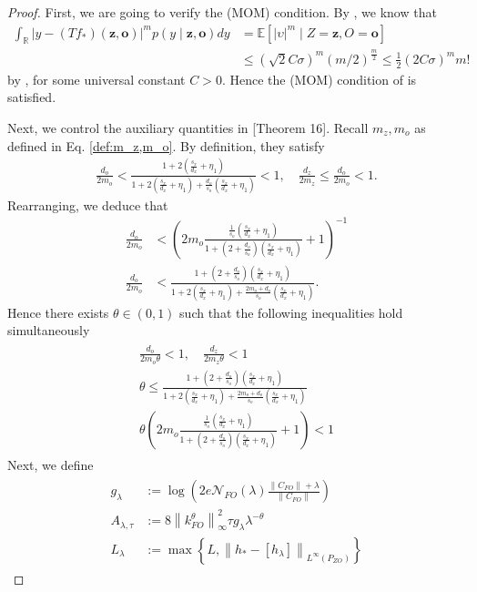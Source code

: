 \documentclass[11pt]{article}
\newcommand{\bz}{\mathbf z}
\newcommand{\bo}{\mathbf o}
\newcommand{\calN}{\mathcal{N}}
\newcommand{\0}{\mathbf{0}}
\begin{document}
\begin{appendix}
\begin{proof}
First, we are going to verify the (MOM) condition.
By , we know that
\begin{align*}
    \int_{\mathbb{R}}\left|y- (T f_\ast)(\bz, \bo)\right|^m p(y \mid \bz, \bo)dy &= \mathbb{E}\left[|\upsilon|^m\mid Z=\bz,O=\bo\right] \\
    &\leq (\sqrt{2}C\sigma)^m(m/2)^{\frac{m}{2}} \leq \frac{1}{2}(2C\sigma)^mm! 
\end{align*}
by \citet[Eq. (2.15)]{vershynin2018high}, for some universal constant $C>0$. Hence the (MOM) condition of \cite{fischer2020sobolev} is satisfied.

Next, we control the auxiliary quantities in \cite{fischer2020sobolev}[Theorem 16]. Recall $m_z,m_o$ as defined in Eq. \eqref{def:m_z,m_o}. By definition, they satisfy
\begin{align*}
    \frac{d_o}{2m_o}<\frac{1 + 2\left(\frac{s_x}{d_x}+\eta_1\right)}{1+2\left(\frac{s_x}{d_x}+\eta_1\right) + \frac{d_o}{s_o}\left(\frac{s_x}{d_x}+\eta_1\right)}<1 , \quad \frac{d_z}{2m_z}\leq \frac{d_o}{2m_o} < 1 .
\end{align*}
Rearranging, we deduce that
\begin{align*}
    \frac{d_o}{2m_o} &< \left( 2m_o\frac{\frac{1}{s_o}(\frac{s_x}{d_x}+\eta_1)}{1+(2+\frac{d_o}{s_o})(\frac{s_x}{d_x}+\eta_1)} + 1\right)^{-1}\\ \frac{d_o}{2m_o} &< \frac{1+(2+\frac{d_o}{s_o})(\frac{s_x}{d_x}+\eta_1)}{1+2(\frac{s_x}{d_x}+\eta_1)+\frac{2m_o+d_o}{s_o}(\frac{s_x}{d_x}+\eta_1)}.
\end{align*}
Hence there exists $\theta\in (0,1)$ such that the following inequalities hold simultaneously
\begin{align}\label{eq:theta_cond}
\begin{aligned}
    \frac{d_o}{2m_o\theta} < 1, \quad \frac{d_z}{2m_z\theta} < 1 \\
    \theta \leq \frac{1+(2+\frac{d_o}{s_o})(\frac{s_x}{d_x}+\eta_1)}{1+2(\frac{s_x}{d_x}+\eta_1)+\frac{2m_o+d_o}{s_o}(\frac{s_x}{d_x}+\eta_1)}\\
    \theta\left( 2m_o\frac{\frac{1}{s_o}(\frac{s_x}{d_x}+\eta_1)}{1+(2+\frac{d_o}{s_o})(\frac{s_x}{d_x}+\eta_1)} + 1\right) < 1
\end{aligned}
\end{align}
Next, we define 
\begin{align}\label{eq:FS_thm_16_const}
\begin{aligned}
    g_{\lambda}&:= \log\left(2e\calN_{FO}(\lambda)\frac{\|C_{FO}\|+\lambda}{\|C_{FO}\|}\right)\\
    A_{\lambda,\tau}&:= 8\left\|k^{\theta}_{FO}\right\|_{\infty}^2\tau g_{\lambda}\lambda^{-\theta}\\
    L_{\lambda}&:=\max\left\{L, \left\|h_{\ast} - [h_{\lambda}]\right\|_{L^{\infty}(P_{ZO})}\right\}
\end{aligned}
\end{align}


\end{proof}
\end{appendix}
\end{document}
